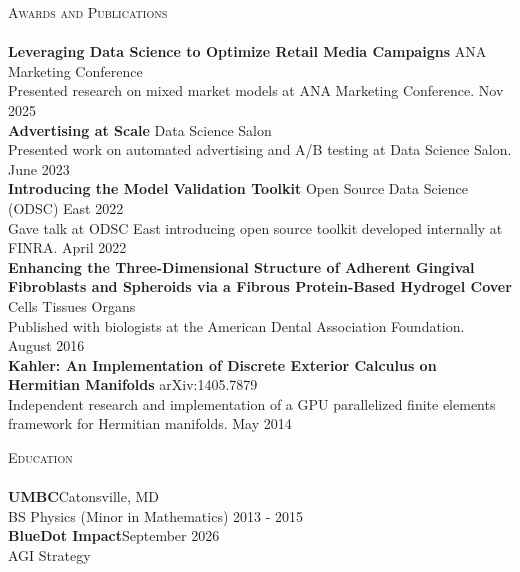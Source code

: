 \documentclass[a4paper]{article}
\newcommand{\lineunder} {
    \vspace*{-8pt} \\
    \hspace*{-18pt} \hrulefill \\
}
\newcommand{\header} [1] {
    {\hspace*{-18pt}\vspace*{6pt} \textsc{#1}}
    \vspace*{-6pt} \lineunder
}
\begin{document}
\header{Awards and Publications}
\textbf{Leveraging Data Science to Optimize Retail Media Campaigns} \hfill ANA Marketing Conference\\
Presented research on mixed market models at ANA Marketing Conference. \hfill Nov 2025\\
\vspace*{2mm}
\textbf{Advertising at Scale} \hfill Data Science Salon\\
Presented work on automated advertising and A/B testing at Data Science Salon. \hfill June 2023\\
\vspace*{2mm}
\textbf{Introducing the Model Validation Toolkit} \hfill Open Source Data Science (ODSC) East 2022\\
Gave talk at ODSC East introducing open source toolkit developed internally at FINRA. \hfill April 2022\\
\vspace*{2mm}
\textbf{Enhancing the Three-Dimensional Structure of Adherent Gingival Fibroblasts and Spheroids via a Fibrous Protein-Based Hydrogel Cover} \hfill Cells Tissues Organs\\
Published with biologists at the American Dental Association Foundation. \hfill August 2016\\
\vspace*{2mm}
\textbf{Kahler: An Implementation of Discrete Exterior Calculus on Hermitian Manifolds} \hfill arXiv:1405.7879\\
Independent research and implementation of a GPU parallelized finite elements framework for Hermitian manifolds. \hfill May 2014\\
\vspace*{2mm}

\header{Education}
\textbf{UMBC}\hfill Catonsville, MD\\
BS Physics (Minor in Mathematics) \hfill 2013 - 2015\\
\vspace{2mm}
\textbf{BlueDot Impact}\hfill September 2026\\
AGI Strategy\\
\vspace{2mm}

\ 
\end{document}
